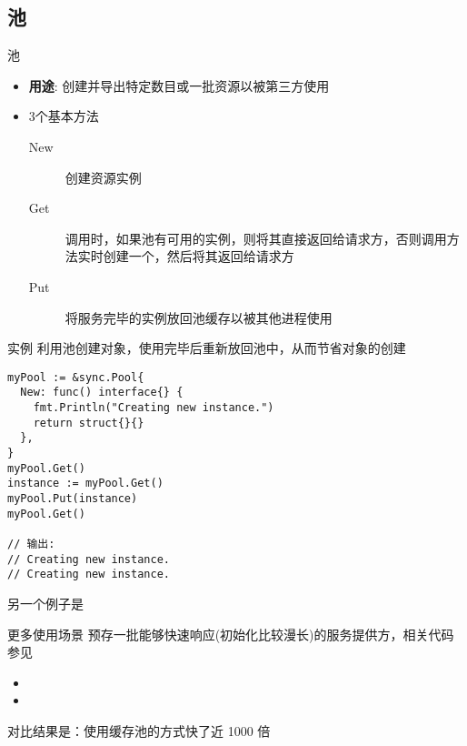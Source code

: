 \subsection{池\Pool }
\begin{frame}{池\Pool }
    \begin{itemize}
        \item \textbf{用途}: \Pool 创建并导出特定数目或一批资源以被第三方使用
        \item 3个基本方法
            \begin{description}
                \item[New] 创建资源实例
                \item[Get] 调用时，如果池有可用的实例，则将其直接返回给请求方，否则调用方法实时创建一个，然后将其返回给请求方
                \item[Put] 将服务完毕的实例放回池缓存以被其他进程使用
            \end{description}
    \end{itemize}
\end{frame}

\begin{frame}[fragile]{实例}
    利用池创建对象，\alert{使用完毕后重新放回池中}，从而节省对象的创建
\begin{lstlisting}
myPool := &sync.Pool{
  New: func() interface{} {
    fmt.Println("Creating new instance.")
    return struct{}{}
  },
}
myPool.Get()
instance := myPool.Get()
myPool.Put(instance)
myPool.Get()

// 输出:
// Creating new instance.
// Creating new instance.
\end{lstlisting}

另一个例子是

\end{frame}

\begin{frame}{更多使用场景}
    预存一批能够快速响应(初始化比较漫长)的服务提供方，相关代码参见
    \begin{itemize}
        \item {}
        \item {}
    \end{itemize}

    \bigskip
    对比结果是：使用缓存池的方式快了近 1000 倍
\end{frame}

